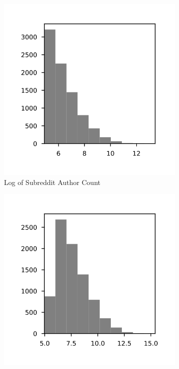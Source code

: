 \documentclass{article}
\begin{document}

\begin{figure}
     \centering
     \begin{subfigure}[b]{0.49\textwidth}
         \centering
         \includegraphics[width=\textwidth]{hist-author_count-log.svg}
         \caption{Log of Subreddit Author Count}
         \label{hist:author}
     \end{subfigure}
     \hfill
     \begin{subfigure}[b]{0.49\textwidth}
         \centering
         \includegraphics[width=\textwidth]{hist-comment_count-log.svg}

\end{subfigure}
\end{figure}
\end{document}
